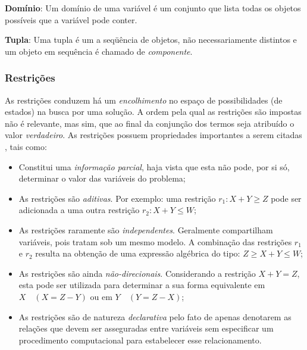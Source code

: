 \documentclass[12pt]{article}
\theoremstyle{definition}
\begin{document}
\textbf{Domínio}: Um domínio de uma variável é um conjunto que lista todas os objetos possíveis que a variável pode conter.

\textbf{Tupla}: Uma tupla é um a seqüência de objetos, não necessariamente distintos e um objeto em sequência é chamado de \textit{componente}.




\subsubsection*{Restrições}
\label{sec:restr}

As restrições  conduzem há um \textit{encolhimento}  no espaço de possibilidades (de estados) na busca por uma solução. A ordem pela qual as restrições são impostas não é relevante, mas sim, que ao final da conjunção dos termos seja atribuído o valor \textit{verdadeiro}. As restrições possuem propriedades importantes a serem citadas \cite{rossi2006}, tais como:

\begin{itemize}
	\item Constitui uma \textit{informação parcial}, haja vista que esta não pode, por si só, determinar o valor das variáveis do problema;

	\item As restrições são \textit{aditivas}. Por exemplo: uma restrição $r_{1}: X + Y \geq Z $ pode ser adicionada a uma outra restrição $r_{2}: X + Y \leq W $;

	\item As restrições raramente são \textit{independentes}. Geralmente compartilham variáveis, pois tratam sob um mesmo modelo. A combinação das restrições $r_{1}$ e $r_{2}$ resulta na obtenção de uma expressão algébrica do tipo: $Z \geq X + Y \leq W$;

	\item As restrições são ainda \textit{não-direcionais}. Considerando a restrição $X + Y = Z$, esta pode ser utilizada para determinar a sua forma equivalente em $X \quad (X = Z - Y)$ ou em $Y \quad (Y = Z - X)$;

	\item As restrições são de natureza \textit{declarativa} pelo fato de apenas denotarem as relações que devem ser asseguradas entre variáveis sem especificar um procedimento computacional para  estabelecer esse relacionamento.
\end{itemize}
\end{document}
